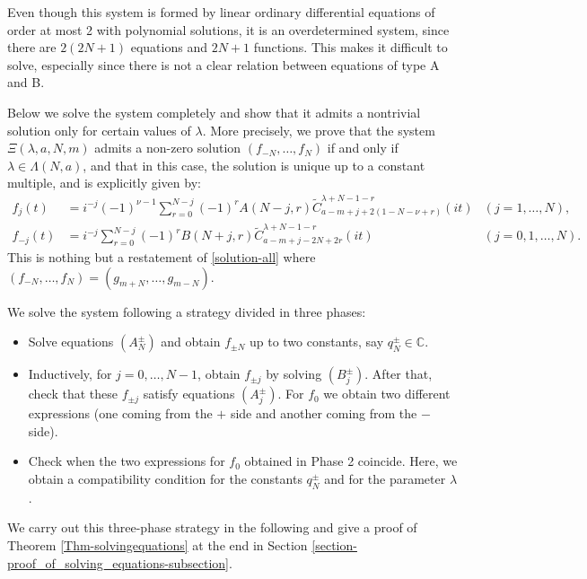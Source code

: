 \documentclass[12pt, pdflatex, a4paper]{article}
\theoremstyle{plain}
\theoremstyle{definition}
\def\C{{\mathbb C}}
\def\Geg{\widetilde{C}}
\begin{document}
Even though this system is formed by linear ordinary differential equations of order at most 2 with polynomial solutions, it is an overdetermined system, since there are $2(2N+1)$ equations and $2N+1$ functions. This makes it difficult to solve, especially since there is not a clear relation between equations of type A and B.

Below we solve the system completely and show that it admits a nontrivial solution only for certain values of $\lambda$. More precisely, we prove that the system $\Xi(\lambda, a, N, m)$ admits a non-zero solution $(f_{-N}, \ldots, f_N)$ if and only if $\lambda \in \Lambda(N, a)$, and that in this case, the solution is unique up to a constant multiple, and is explicitly given by:
\begin{align*}
f_j(t) &= i^{-j}(-1)^{\nu-1}\sum_{r=0}^{N-j}(-1)^r A(N-j, r) \Geg_{a-m+j+2(1-N-\nu+r)}^{\lambda+N-1-r}(it) & (j= 1, \ldots, N),\\
f_{-j}(t) &= i^{-j}\sum_{r=0}^{N-j}(-1)^rB(N+j,r)\Geg_{a-m+j-2N+2r}^{\lambda+N-1-r}(it) & (j= 0, 1, \ldots, N).
\end{align*}
This is nothing but a restatement of \eqref{solution-all} where $(f_{-N}, \ldots, f_N) = (g_{m+N}, \ldots, g_{m-N})$.


We solve the system following a strategy divided in three phases:

\begin{itemize}[leftmargin=2cm, topsep=3pt]
\setlength{\itemsep}{2pt}
\item[\textbf{Phase 1}:] Solve equations $(A_N^\pm)$ and obtain $f_{\pm N}$ up to two constants, say $q_N^\pm \in \C$.

\item[\textbf{Phase 2}:] Inductively, for $j = 0, \dots, N-1$, obtain $f_{\pm j}$ by solving $(B_j^\pm)$. After that, check that these $f_{\pm j}$ satisfy equations $(A_j^{\pm})$. For $f_0$ we obtain two different expressions (one coming from the $+$ side and another coming from the $-$ side).

\item[\textbf{Phase 3}:] Check when the two expressions for $f_0$  obtained in Phase 2 coincide. Here, we obtain a compatibility condition for the constants $q_N^\pm$ and for the parameter $\lambda$. 
\end{itemize}

We carry out this three-phase strategy in the following and give a proof of Theorem \ref{Thm-solvingequations} at the end in Section \ref{section-proof_of_solving_equations-subsection}.
\end{document}
